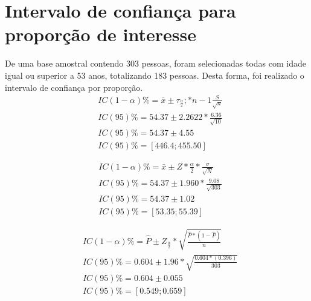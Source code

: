 \chapter{Intervalo de confiança para proporção de interesse}

    De uma base amostral contendo 303 pessoas, foram selecionadas todas com idade
    igual ou superior a 53 anos, totalizando 183 pessoas. Desta forma, foi realizado 
    o intervalo de confiança por proporção.
    \begin{equation} \label{eq1}
    \begin{split}
    & IC(1-\alpha)\%= \bar{x} \pm \tau_\frac{\alpha}{2} ; * n-1 \frac{S}{\sqrt{n}} \\
    & IC(95)\% = 54.37 \pm 2.2622 * \frac{6.36}{\sqrt{10}} \\
    & IC(95)\% = 54.37 \pm 4.55 \\
    & IC(95)\% = [446.4 ; 455.50] 
    \end{split}
    \end{equation}

    \begin{equation} \label{eq2}
    \begin{split}
    & IC(1-\alpha)\%= \bar{x} \pm Z*\frac{\alpha}{2} * \frac{\sigma}{\sqrt{N}} \\
    & IC(95)\% = 54.37 \pm 1.960 * \frac{9.08}{\sqrt{303}} \\
    & IC(95)\% = 54.37 \pm 1.02 \\
    & IC(95)\% = [53.35 ; 55.39] 
    \end{split}
    \end{equation}


    \begin{equation} \label{eq3}
    \begin{split}
    & IC(1-\alpha)\%= \hat{P} \pm Z_\frac{\alpha}{2} * \sqrt{\frac{\hat{P}*(1-\hat{P})}{n}} \\
    & IC(95)\% = 0.604 \pm 1.96 * \sqrt{\frac{0.604*(0.396)}{303}} \\
    & IC(95)\% = 0.604 \pm 0.055 \\
    & IC(95)\% = [0.549 ; 0.659] 
    \end{split}
    \end{equation}

